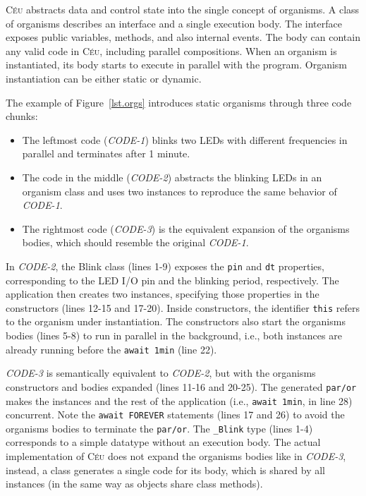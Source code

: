 \documentclass{acm_proc_article-sp}
\newcommand{\CEU}{\textsc{C\'{e}u}\xspace}
\newcommand{\code}[1] {{\small{\texttt{#1}}}}
\newcommand{\1}{\;}
\newcommand{\2}{\;\;}
\newcommand{\3}{\;\;\;}
\newcommand{\5}{\;\;\;\;\;}
\begin{document}
\CEU abstracts data and control state into the single concept of organisms.
%
A class of organisms describes an interface and a single execution body.
The interface exposes public variables, methods, and also internal events.
The body can contain any valid code in \CEU, including parallel compositions.
When an organism is instantiated, its body starts to execute in parallel with 
the program.
Organism instantiation can be either static or dynamic.

The example of Figure~\ref{lst.orgs} introduces static organisms through three 
code chunks:
%
\begin{itemize}
\item The leftmost code (\emph{CODE-1}) blinks two LEDs with different 
frequencies in parallel and terminates after 1 minute.
%
\item The code in the middle (\emph{CODE-2}) abstracts the blinking LEDs in an 
organism class and uses two instances to reproduce the same behavior of 
\emph{CODE-1}.
%
\item The rightmost code (\emph{CODE-3}) is the equivalent expansion of the 
organisms bodies, which should resemble the original \emph{CODE-1}.
\end{itemize}
%
In \emph{CODE-2}, the Blink class (lines 1-9) exposes the \code{pin} and 
\code{dt} properties, corresponding to the LED I/O pin and the blinking period, 
respectively.
The application then creates two instances, specifying those properties in the 
constructors (lines 12-15 and 17-20).
Inside constructors, the identifier \code{this} refers to the organism under 
instantiation.
The constructors also start the organisms bodies (lines 5-8) to run in parallel 
in the background, i.e., both instances are already running before the 
\code{await 1min} (line 22).

\emph{CODE-3} is semantically equivalent to \emph{CODE-2}, but with the 
organisms constructors and bodies expanded (lines 11-16 and 20-25).
The generated \code{par/or} makes the instances and the rest of the application 
(i.e., \code{await 1min}, in line 28) concurrent.
Note the \code{await FOREVER} statements (lines 17 and 26) to avoid the 
organisms bodies to terminate the \code{par/or}.
The \code{\_Blink} type (lines 1-4) corresponds to a simple datatype without an
execution body.
%
The actual implementation of \CEU does not expand the organisms bodies like in 
\emph{CODE-3}, instead, a class generates a single code for its body, which is 
shared by all instances (in the same way as objects share class methods).
\end{document}
